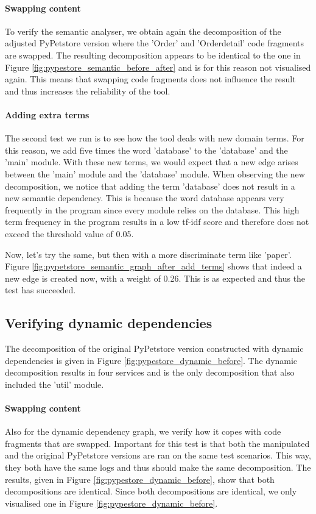 \paragraph{Swapping content}
To verify the semantic analyser, we obtain again the decomposition of the adjusted PyPetstore version where the 'Order' and 'Orderdetail' code fragments are swapped. The resulting decomposition appears to be identical to the one in Figure \ref{fig:pypestore_semantic_before_after} and is for this reason not visualised again. This means that swapping code fragments does not influence the result and thus increases the reliability of the tool. \par



\paragraph{Adding extra terms}
The second test we run is to see how the tool deals with new domain terms. For this reason, we add five times the word 'database' to the 'database' and the 'main' module. With these new terms, we would expect that a new edge arises between the 'main' module and the 'database' module. When observing the new decomposition, we notice that adding the term 'database' does not result in a new semantic dependency. This is because the word database appears very frequently in the program since every module relies on the database. This high term frequency in the program results in a low tf-idf score and therefore does not exceed the threshold value of 0.05. \par
Now, let's try the same, but then with a more discriminate term like 'paper'. Figure \ref{fig:pypetstore_semantic_graph_after_add_terms} shows that indeed a new edge is created now, with a weight of 0.26. This is as expected and thus the test has succeeded.



\subsection{Verifying dynamic dependencies}
The decomposition of the original PyPetstore version constructed with dynamic dependencies is given in Figure \ref{fig:pypestore_dynamic_before}. The dynamic decomposition results in four services and is the only decomposition that also included the 'util' module. 

\paragraph{Swapping content}
Also for the dynamic dependency graph, we verify how it copes with code fragments that are swapped. Important for this test is that both the manipulated and the original PyPetstore versions are ran on the same test scenarios. This way, they both have the same logs and thus should make the same decomposition. The results, given in Figure \ref{fig:pypestore_dynamic_before}, show that both decompositions are identical. Since both decompositions are identical, we only visualised one in Figure \ref{fig:pypestore_dynamic_before}.

